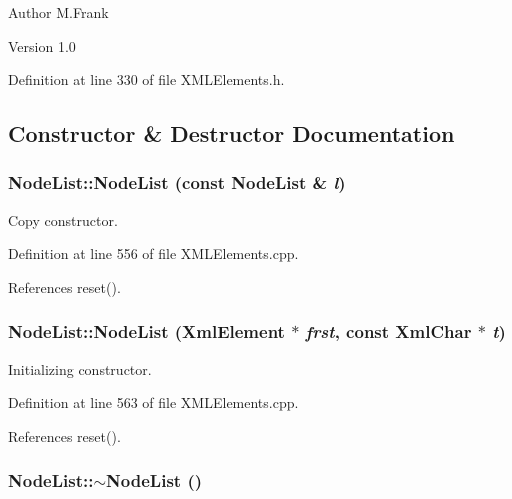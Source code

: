 \begin{DoxyAuthor}{Author}
M.Frank 
\end{DoxyAuthor}
\begin{DoxyVersion}{Version}
1.0 
\end{DoxyVersion}


Definition at line 330 of file XMLElements.h.

\subsection{Constructor \& Destructor Documentation}
\hypertarget{class_d_d4hep_1_1_x_m_l_1_1_node_list_a26cb6e55d1caaceb8753eb05280a7e46}{
\subsubsection[{NodeList}]{\setlength{\rightskip}{0pt plus 5cm}NodeList::NodeList (const {\bf NodeList} \& {\em l})}}
\label{class_d_d4hep_1_1_x_m_l_1_1_node_list_a26cb6e55d1caaceb8753eb05280a7e46}


Copy constructor. 

Definition at line 556 of file XMLElements.cpp.

References reset().\hypertarget{class_d_d4hep_1_1_x_m_l_1_1_node_list_a8711c5612f382425754b2b8d7b01a7dc}{
\subsubsection[{NodeList}]{\setlength{\rightskip}{0pt plus 5cm}NodeList::NodeList (XmlElement $\ast$ {\em frst}, \/  const {\bf XmlChar} $\ast$ {\em t})}}
\label{class_d_d4hep_1_1_x_m_l_1_1_node_list_a8711c5612f382425754b2b8d7b01a7dc}


Initializing constructor. 

Definition at line 563 of file XMLElements.cpp.

References reset().\hypertarget{class_d_d4hep_1_1_x_m_l_1_1_node_list_a77b664c0c6c93d1c6eccbd10581396af}{
\subsubsection[{$\sim$NodeList}]{\setlength{\rightskip}{0pt plus 5cm}NodeList::$\sim$NodeList ()}}
\label{class_d_d4hep_1_1_x_m_l_1_1_node_list_a77b664c0c6c93d1c6eccbd10581396af}


